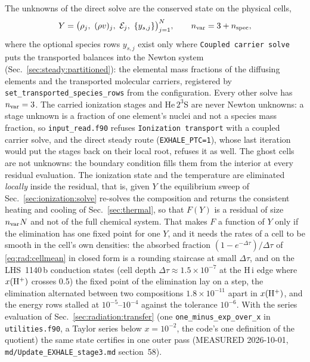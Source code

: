 The unknowns of the direct solve are the conserved state on the physical cells,
%
\begin{equation}
  Y = \bigl(\rho_j,\ (\rho v)_j,\ \mathcal{E}_j,\ \{y_{s,j}\}\bigr)_{j=1}^{N},
  \qquad n_{\rm var} = 3 + n_{\rm spec},
  \label{eq:unknowns}
\end{equation}
%
where the optional species rows $y_{s,j}$ exist only where \texttt{Coupled
carrier solve} puts the transported balances into the Newton system
(Sec.~\ref{sec:steady:partitioned}): the elemental mass fractions of the
diffusing elements and the transported molecular carriers, registered by
\texttt{set\_transported\_species\_rows} from the configuration.  Every other
solve has $n_{\rm var} = 3$.  The carried ionization stages and He\,$2^3$S are
never Newton unknowns: a stage unknown is a fraction of one element's nuclei
and not a species mass fraction, so \texttt{input\_read.f90} refuses
\texttt{Ionization transport} with a coupled carrier solve, and the direct
steady route (\texttt{EXHALE\_PTC=1}), whose last iteration would put the
stages back on their local root, refuses it as well.  The ghost
cells are not unknowns: the boundary condition fills them from the interior at
every residual evaluation.  The ionization state and the temperature are
eliminated \emph{locally} inside the residual, that is, given $Y$ the
equilibrium sweep of Sec.~\ref{sec:ionization:solve} re-solves the composition
and returns the consistent heating and cooling of Sec.~\ref{sec:thermal}, so that $F(Y)$ is a residual of size $n_{\rm var}N$ and not of the
full chemical system.  That makes $F$ a function of $Y$ only if the
elimination has one fixed point for one $Y$, and it needs the rates of a
cell to be smooth in the cell's own densities: the absorbed fraction
$(1-e^{-\Delta\tau})/\Delta\tau$ of \eqref{eq:rad:cellmean} in closed form is
a rounding staircase at small $\Delta\tau$, and on the LHS~1140\,b
conduction states (cell depth $\Delta\tau\approx1.5\times10^{-7}$ at the H\,{\sc i}
edge where $x({\rm H^+})$ crosses 0.5) the fixed point of the elimination lay
on a step, the elimination alternated between two compositions
$1.8\times10^{-11}$ apart in $x({\rm H^+})$, and the energy rows stalled at
$10^{-5}$--$10^{-4}$ against the tolerance $10^{-6}$.  With the series
evaluation of Sec.~\ref{sec:radiation:transfer} (one
\texttt{one\_minus\_exp\_over\_x} in \texttt{utilities.f90}, a Taylor series
below $x = 10^{-2}$, the code's one definition of the
quotient) the same state certifies in
one outer pass (MEASURED 2026-10-01, \texttt{md/Update\_EXHALE\_stage3.md}
section~58).

